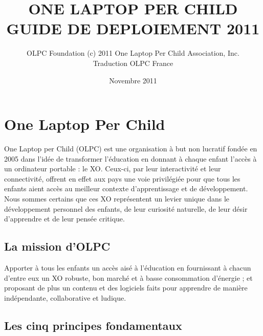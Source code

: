 \documentclass[11pt]{article}
\title{ONE LAPTOP PER CHILD\\GUIDE DE DEPLOIEMENT 2011}
\author{OLPC Foundation (c) 2011 One Laptop Per Child Association, Inc.\\Traduction OLPC France}
\date{Novembre 2011}
\begin{document}
\maketitle

\setcounter{tocdepth}{3}
\tableofcontents
\vspace*{1cm}

\listoffigures
\listoftables
\pagebreak

\section{One Laptop Per Child}
\label{sec-1}


One Laptop per Child (OLPC) est une organisation à but non lucratif fondée
en 2005 dans l'idée de transformer l'éducation en donnant à chaque enfant
l'accès à un ordinateur portable : le XO. Ceux-ci, par leur interactivité
et leur connectivité, offrent en effet aux pays une voie privilégiée pour
que tous les enfants aient accès au meilleur contexte d'apprentissage et de
développement. Nous sommes certains que ces XO représentent un levier
unique dans le développement personnel des enfants, de leur curiosité
naturelle, de leur désir d'apprendre et de leur pensée critique.
\subsection{La mission d'OLPC}
\label{sec-1-1}


Apporter à tous les enfants un accès aisé à l'éducation en fournissant à
chacun d'entre eux un XO robuste, bon marché et à basse consommation
d'énergie ; et proposant de plus un contenu et des logiciels faits pour
apprendre de manière indépendante, collaborative et ludique.
\subsection{Les cinq principes fondamentaux}
\label{sec-1-2}
\end{document}

